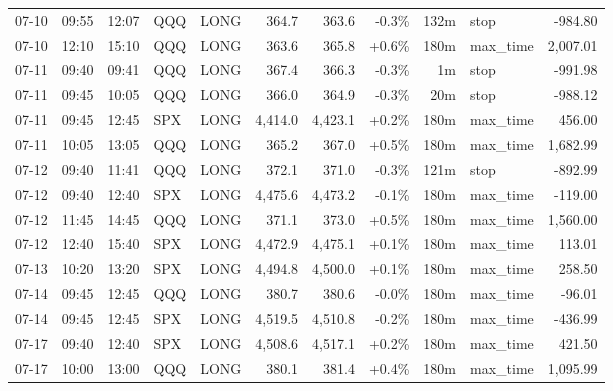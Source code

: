 \documentclass[11pt,a4paper,twoside]{article}
\begin{document}
\begin{center}
\begin{longtable}{>{\color{txtmain}}l l l l l r r r r >{\color{txtmain}}l r}
07-10 & 09:55 & 12:07 & QQQ & LONG & 364.7 & 363.6 & \textcolor{lossred}{-0.3\%} & 132m & stop & \textcolor{lossred}{-984.80} \\
07-10 & 12:10 & 15:10 & QQQ & LONG & 363.6 & 365.8 & \textcolor{wingreen}{+0.6\%} & 180m & max\_time & \textcolor{wingreen}{2,007.01} \\
07-11 & 09:40 & 09:41 & QQQ & LONG & 367.4 & 366.3 & \textcolor{lossred}{-0.3\%} & 1m & stop & \textcolor{lossred}{-991.98} \\
07-11 & 09:45 & 10:05 & QQQ & LONG & 366.0 & 364.9 & \textcolor{lossred}{-0.3\%} & 20m & stop & \textcolor{lossred}{-988.12} \\
07-11 & 09:45 & 12:45 & SPX & LONG & 4,414.0 & 4,423.1 & \textcolor{wingreen}{+0.2\%} & 180m & max\_time & \textcolor{wingreen}{456.00} \\
07-11 & 10:05 & 13:05 & QQQ & LONG & 365.2 & 367.0 & \textcolor{wingreen}{+0.5\%} & 180m & max\_time & \textcolor{wingreen}{1,682.99} \\
07-12 & 09:40 & 11:41 & QQQ & LONG & 372.1 & 371.0 & \textcolor{lossred}{-0.3\%} & 121m & stop & \textcolor{lossred}{-892.99} \\
07-12 & 09:40 & 12:40 & SPX & LONG & 4,475.6 & 4,473.2 & \textcolor{lossred}{-0.1\%} & 180m & max\_time & \textcolor{lossred}{-119.00} \\
07-12 & 11:45 & 14:45 & QQQ & LONG & 371.1 & 373.0 & \textcolor{wingreen}{+0.5\%} & 180m & max\_time & \textcolor{wingreen}{1,560.00} \\
07-12 & 12:40 & 15:40 & SPX & LONG & 4,472.9 & 4,475.1 & \textcolor{wingreen}{+0.1\%} & 180m & max\_time & \textcolor{wingreen}{113.01} \\
07-13 & 10:20 & 13:20 & SPX & LONG & 4,494.8 & 4,500.0 & \textcolor{wingreen}{+0.1\%} & 180m & max\_time & \textcolor{wingreen}{258.50} \\
07-14 & 09:45 & 12:45 & QQQ & LONG & 380.7 & 380.6 & \textcolor{lossred}{-0.0\%} & 180m & max\_time & \textcolor{lossred}{-96.01} \\
07-14 & 09:45 & 12:45 & SPX & LONG & 4,519.5 & 4,510.8 & \textcolor{lossred}{-0.2\%} & 180m & max\_time & \textcolor{lossred}{-436.99} \\
07-17 & 09:40 & 12:40 & SPX & LONG & 4,508.6 & 4,517.1 & \textcolor{wingreen}{+0.2\%} & 180m & max\_time & \textcolor{wingreen}{421.50} \\
07-17 & 10:00 & 13:00 & QQQ & LONG & 380.1 & 381.4 & \textcolor{wingreen}{+0.4\%} & 180m & max\_time & \textcolor{wingreen}{1,095.99} \\

\end{longtable}
\end{center}
\end{document}
